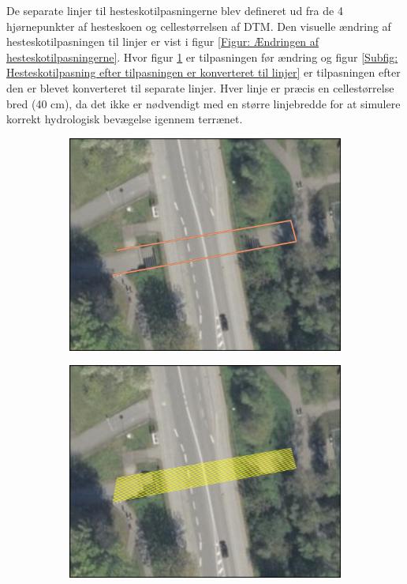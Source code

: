 De separate linjer til hesteskotilpasningerne blev defineret ud fra de 4 hjørnepunkter af hesteskoen og cellestørrelsen af DTM. Den visuelle ændring af hesteskotilpasningen til linjer er vist i figur \ref{Figur: Ændringen af hesteskotilpasningerne}. Hvor figur \ref{Subfig: Hesteskotilpasninger før ændring} er tilpasningen før ændring og figur \ref{Subfig: Hesteskotilpasning efter tilpasningen er konverteret til linjer} er tilpasningen efter den er blevet konverteret til separate linjer. Hver linje er præcis en cellestørrelse bred (40 cm), da det ikke er nødvendigt med en større linjebredde for at simulere korrekt hydrologisk bevægelse igennem terrænet. 
\begin{figure}[H]
    \begin{subfigure}[t]{0.5\textwidth}
        \centering
        \includegraphics[width=1\linewidth]{images/databeskrivelse/hestesko.jpg}
        \caption{}
        \label{Subfig: Hesteskotilpasninger før ændring}
    \end{subfigure}
    \hspace{0.2cm}
    \begin{subfigure}[t]{0.5\textwidth}
        \centering
        \includegraphics[width=1\linewidth]{images/metode/hestesko_linjer.jpg}

\end{subfigure}
\end{figure}
